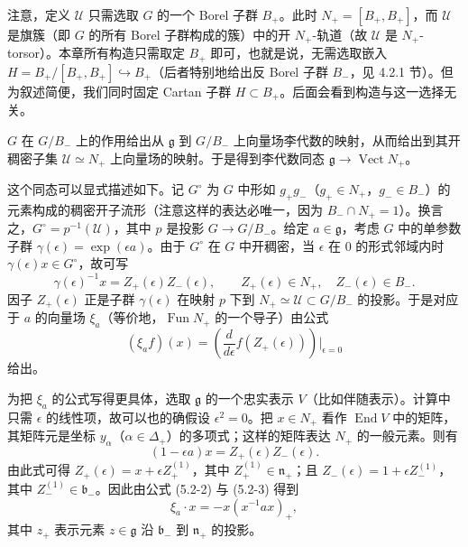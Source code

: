 注意，定义 $\mathcal{U}$ 只需选取 $G$ 的一个 Borel 子群 $B_+$。此时 $N_+=[B_+,B_+]$，而 $\mathcal{U}$ 是旗簇（即 $G$ 的所有 Borel 子群构成的簇）中的开 $N_+$-轨道（故 $\mathcal{U}$ 是 $N_+$-torsor）。本章所有构造只需取定 $B_+$ 即可，也就是说，无需选取嵌入 $H=B_+/[B_+,B_+]\hookrightarrow B_+$（后者特别地给出反 Borel 子群 $B_-$，见 4.2.1 节）。但为叙述简便，我们同时固定 Cartan 子群 $H\subset B_+$。后面会看到构造与这一选择无关。

$G$ 在 $G/B_-$ 上的作用给出从 $\mathfrak{g}$ 到 $G/B_-$ 上向量场李代数的映射，从而给出到其开稠密子集 $\mathcal{U}\simeq N_+$ 上向量场的映射。于是得到李代数同态 $\mathfrak{g}\to\operatorname{Vect}N_+$。

这个同态可以显式描述如下。记 $G^\circ$ 为 $G$ 中形如 $g_+g_-$（$g_+\in N_+$，$g_-\in B_-$）的元素构成的稠密开子流形（注意这样的表达必唯一，因为 $B_-\cap N_+=1$）。换言之，$G^\circ=p^{-1}(\mathcal{U})$，其中 $p$ 是投影 $G\to G/B_-$。给定 $a\in\mathfrak{g}$，考虑 $G$ 中的单参数子群 $\gamma(\epsilon)=\exp(\epsilon a)$。由于 $G^\circ$ 在 $G$ 中开稠密，当 $\epsilon$ 在 $0$ 的形式邻域内时 $\gamma(\epsilon)x\in G^\circ$，故可写
\[
    \gamma(\epsilon)^{-1}x=Z_+(\epsilon)Z_-(\epsilon),\qquad
    Z_+(\epsilon)\in N_+,\quad Z_-(\epsilon)\in B_-.
\]
因子 $Z_+(\epsilon)$ 正是子群 $\gamma(\epsilon)$ 在映射 $p$ 下到 $N_+\simeq\mathcal{U}\subset G/B_-$ 的投影。于是对应于 $a$ 的向量场 $\xi_a$（等价地，$\operatorname{Fun}N_+$ 的一个导子）由公式
\begin{equation}
    (\xi_a f)(x)=\left(\frac{d}{d\epsilon}f(Z_+(\epsilon))\right)\bigg|_{\epsilon=0}
    \tag{5.2-2}
\end{equation}
给出。

为把 $\xi_a$ 的公式写得更具体，选取 $\mathfrak{g}$ 的一个忠实表示 $V$（比如伴随表示）。计算中只需 $\epsilon$ 的线性项，故可以也的确假设 $\epsilon^2=0$。把 $x\in N_+$ 看作 $\operatorname{End}V$ 中的矩阵，其矩阵元是坐标 $y_\alpha$（$\alpha\in\Delta_+$）的多项式；这样的矩阵表达 $N_+$ 的一般元素。则有
\begin{equation}
    (1-\epsilon a)x=Z_+(\epsilon)Z_-(\epsilon).
    \tag{5.2-3}
\end{equation}
由此式可得 $Z_+(\epsilon)=x+\epsilon Z_+^{(1)}$，其中 $Z_+^{(1)}\in\mathfrak{n}_+$；且 $Z_-(\epsilon)=1+\epsilon Z_-^{(1)}$，其中 $Z_-^{(1)}\in\mathfrak{b}_-$。因此由公式 (5.2-2) 与 (5.2-3) 得到
\begin{equation}
    \xi_a\cdot x=-x(x^{-1}ax)_+ ,
    \tag{5.2-4}
\end{equation}
其中 $z_+$ 表示元素 $z\in\mathfrak{g}$ 沿 $\mathfrak{b}_-$ 到 $\mathfrak{n}_+$ 的投影。

